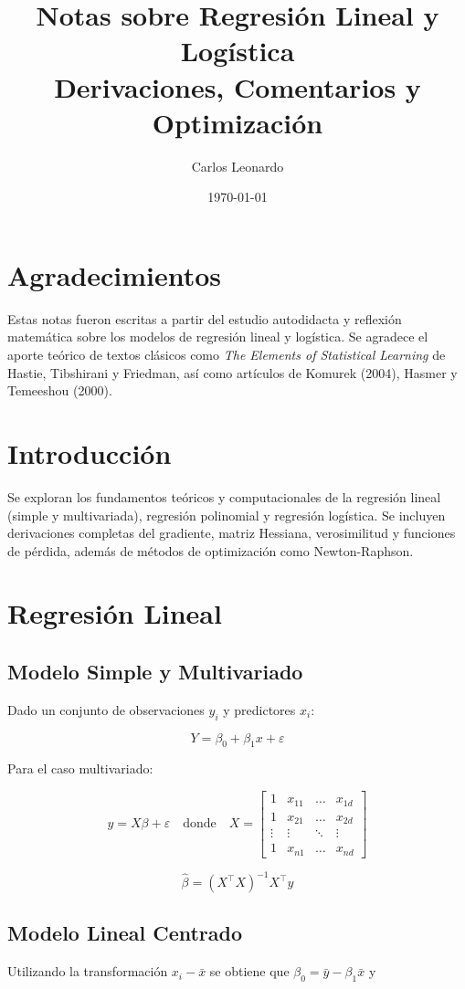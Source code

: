 \documentclass[12pt]{article}
\title{Notas sobre Regresión Lineal y Logística \\ \large Derivaciones, Comentarios y Optimización}
\author{Carlos Leonardo}
\date{\today}
\begin{document}
\maketitle

\section*{Agradecimientos}
Estas notas fueron escritas a partir del estudio autodidacta y reflexión matemática sobre los modelos de regresión lineal y logística. Se agradece el aporte teórico de textos clásicos como \textit{The Elements of Statistical Learning} de Hastie, Tibshirani y Friedman, así como artículos de Komurek (2004), Hasmer y Temeeshou (2000).

\newpage
\tableofcontents
\newpage

\section{Introducción}
Se exploran los fundamentos teóricos y computacionales de la regresión lineal (simple y multivariada), regresión polinomial y regresión logística. Se incluyen derivaciones completas del gradiente, matriz Hessiana, verosimilitud y funciones de pérdida, además de métodos de optimización como Newton-Raphson.

\section{Regresión Lineal}
\subsection{Modelo Simple y Multivariado}
Dado un conjunto de observaciones $y_i$ y predictores $x_i$:

\[
Y = \beta_0 + \beta_1 x + \varepsilon
\]

Para el caso multivariado:

\[
y = X\beta + \varepsilon
\quad \text{donde} \quad 
X = \begin{bmatrix}
1 & x_{11} & \dots & x_{1d} \\
1 & x_{21} & \dots & x_{2d} \\
\vdots & \vdots & \ddots & \vdots \\
1 & x_{n1} & \dots & x_{nd}
\end{bmatrix}
\]

\[
\hat{\beta} = (X^\top X)^{-1} X^\top y
\]

\subsection{Modelo Lineal Centrado}
Utilizando la transformación $x_i - \bar{x}$ se obtiene que $\beta_0 = \bar{y} - \beta_1 \bar{x}$ y
\end{document}
